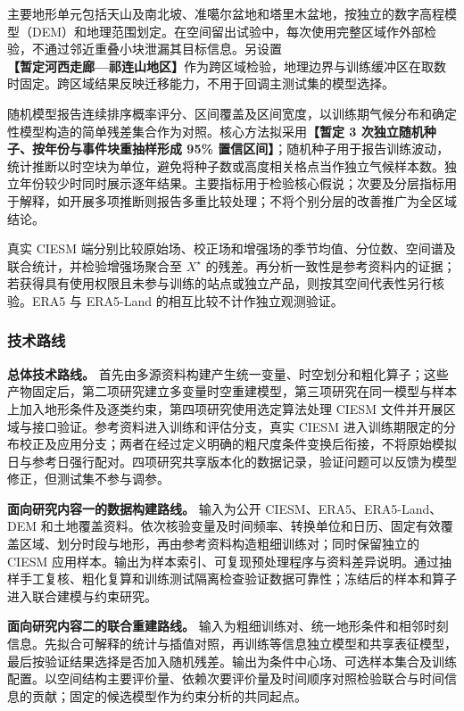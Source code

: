 主要地形单元包括天山及南北坡、准噶尔盆地和塔里木盆地，按独立的数字高程模型（DEM）和地理范围划定。在空间留出试验中，每次使用完整区域作外部检验，不通过邻近重叠小块泄漏其目标信息。另设置\textbf{【暂定河西走廊—祁连山地区】}作为跨区域检验，地理边界与训练缓冲区在取数时固定。跨区域结果反映迁移能力，不用于回调主测试集的模型选择。

随机模型报告连续排序概率评分、区间覆盖及区间宽度，以训练期气候分布和确定性模型构造的简单残差集合作为对照。核心方法拟采用\textbf{【暂定 3 次独立随机种子、按年份与事件块重抽样形成 95\% 置信区间】}；随机种子用于报告训练波动，统计推断以时空块为单位，避免将种子数或高度相关格点当作独立气候样本数。独立年份较少时同时展示逐年结果。主要指标用于检验核心假说；次要及分层指标用于解释，如开展多项推断则报告多重比较处理；不将个别分层的改善推广为全区域结论。

真实 CIESM 端分别比较原始场、校正场和增强场的季节均值、分位数、空间谱及联合统计，并检验增强场聚合至 $X^{\star}$ 的残差。再分析一致性是参考资料内的证据；若获得具有使用权限且未参与训练的站点或独立产品，则按其空间代表性另行核验。ERA5 与 ERA5-Land 的相互比较不计作独立观测验证。

\subsubsection{技术路线}

\textbf{总体技术路线。}
首先由多源资料构建产生统一变量、时空划分和粗化算子；这些产物固定后，第二项研究建立多变量时空重建模型，第三项研究在同一模型与样本上加入地形条件及逐类约束，第四项研究使用选定算法处理 CIESM 文件并开展区域与接口验证。参考资料进入训练和评估分支，真实 CIESM 进入训练期限定的分布校正及应用分支；两者在经过定义明确的粗尺度条件变换后衔接，不将原始模拟日与参考日强行配对。四项研究共享版本化的数据记录，验证问题可以反馈为模型修正，但测试集不参与调参。

\textbf{面向研究内容一的数据构建路线。}
输入为公开 CIESM、ERA5、ERA5-Land、DEM 和土地覆盖资料。依次核验变量及时间频率、转换单位和日历、固定有效覆盖区域、划分时段与地形，再由参考资料构造粗细训练对；同时保留独立的 CIESM 应用样本。输出为样本索引、可复现预处理程序与资料差异说明。通过抽样手工复核、粗化复算和训练测试隔离检查验证数据可靠性；冻结后的样本和算子进入联合建模与约束研究。

\textbf{面向研究内容二的联合重建路线。}
输入为粗细训练对、统一地形条件和相邻时刻信息。先拟合可解释的统计与插值对照，再训练等信息独立模型和共享表征模型，最后按验证结果选择是否加入随机残差。输出为条件中心场、可选样本集合及训练配置。以空间结构主要评价量、依赖次要评价量及时间顺序对照检验联合与时间信息的贡献；固定的候选模型作为约束分析的共同起点。

